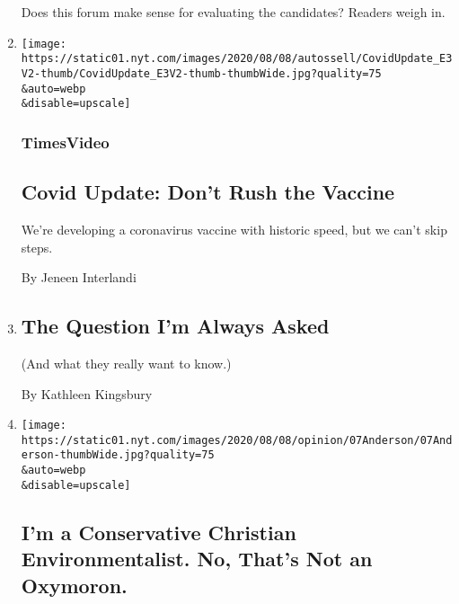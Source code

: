 \begin{enumerate}
  Does this forum make sense for evaluating the candidates? Readers
  weigh in.
\item
  \href{/video/opinion/100000007278127/coronavirus-vaccine-update.html}{}

  \texttt{[image: https://static01.nyt.com/images/2020/08/08/autossell/CovidUpdate\_E3V2-thumb/CovidUpdate\_E3V2-thumb-thumbWide.jpg?quality=75\\\&auto=webp\\\&disable=upscale]}

  \hypertarget{timesvideo}{%
  \subsubsection{TimesVideo}\label{timesvideo}}

  \hypertarget{covid-update-dont-rush-the-vaccine}{%
  \subsection{Covid Update: Don't Rush the
  Vaccine}\label{covid-update-dont-rush-the-vaccine}}

  We're developing a coronavirus vaccine with historic speed, but we
  can't skip steps.

  By Jeneen Interlandi
\item
  \href{/2020/08/07/opinion/the-question-im-always-asked.html}{}

  \hypertarget{the-question-im-always-asked}{%
  \subsection{The Question I'm Always
  Asked}\label{the-question-im-always-asked}}

  (And what they really want to know.)

  By Kathleen Kingsbury
\item
  \href{/2020/08/07/opinion/republicans-climate-change.html}{}

  \texttt{[image: https://static01.nyt.com/images/2020/08/08/opinion/07Anderson/07Anderson-thumbWide.jpg?quality=75\\\&auto=webp\\\&disable=upscale]}

  \hypertarget{im-a-conservative-christian-environmentalist-no-thats-not-an-oxymoron-1}{%
  \subsection{I'm a Conservative Christian Environmentalist. No, That's
  Not an
  Oxymoron.}\label{im-a-conservative-christian-environmentalist-no-thats-not-an-oxymoron-1}}


\end{enumerate}
